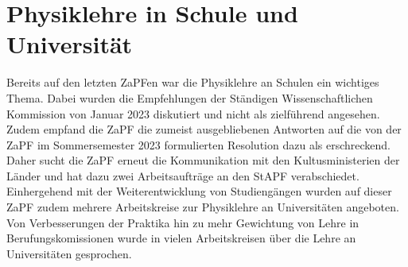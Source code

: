 \documentclass{scrartcl}
\begin{document}
\section*{Physiklehre in Schule und Universität}
Bereits auf den letzten ZaPFen war die Physiklehre an Schulen ein wichtiges Thema. Dabei wurden die Empfehlungen der Ständigen Wissenschaftlichen Kommission von Januar 2023 diskutiert und nicht als zielführend angesehen. Zudem empfand die ZaPF die zumeist ausgebliebenen Antworten auf die von der ZaPF im Sommersemester 2023 formulierten Resolution dazu als erschreckend. Daher sucht die ZaPF erneut die Kommunikation mit den Kultusministerien der Länder und hat dazu zwei Arbeitsaufträge an den StAPF verabschiedet. Einhergehend mit der Weiterentwicklung von Studiengängen wurden auf dieser ZaPF zudem mehrere Arbeitskreise zur Physiklehre an Universitäten angeboten.\\
Von Verbesserungen der Praktika hin zu mehr Gewichtung von Lehre in Berufungskomissionen wurde in vielen Arbeitskreisen über die Lehre an Universitäten gesprochen.
\end{document}
